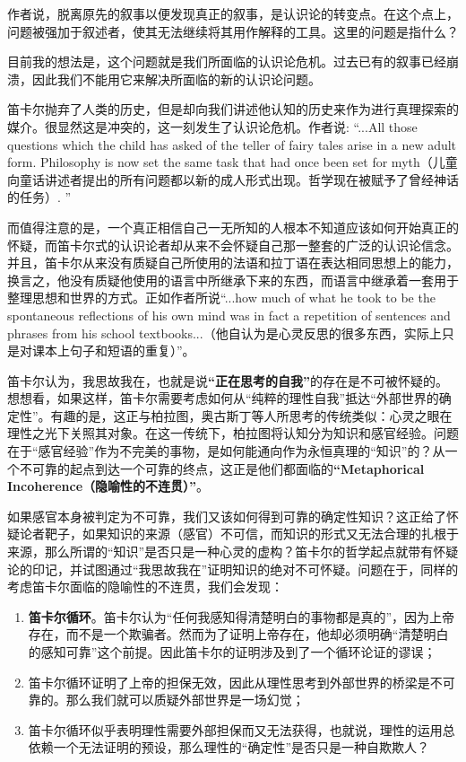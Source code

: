 \documentclass[12pt, a4paper, oneside]{ctexart}
\renewcommand{\b}{\textbf}
\newcommand{\q}[1]{\begin{questionbox}{}#1\end{questionbox}}
\newcommand{\ans}[1]{\begin{ansbox}{}#1\end{ansbox}}
\newcounter{question}[section]
\newcounter{ans}[section]
\begin{document}
\q{作者说，脱离原先的叙事以便发现真正的叙事，是认识论的转变点。在这个点上，问题被强加于叙述者，使其无法继续将其用作解释的工具。这里的问题是指什么？}
\ans{目前我的想法是，这个问题就是我们所面临的认识论危机。过去已有的叙事已经崩溃，因此我们不能用它来解决所面临的新的认识论问题。}

笛卡尔抛弃了人类的历史，但是却向我们讲述他认知的历史来作为进行真理探索的媒介。很显然这是冲突的，这一刻发生了认识论危机。作者说: “...All those questions which the child has asked of the teller of fairy tales arise in a new adult form. Philosophy is now set the same task that had once been set for myth（儿童向童话讲述者提出的所有问题都以新的成人形式出现。哲学现在被赋予了曾经神话的任务）. ”

而值得注意的是，一个真正相信自己一无所知的人根本不知道应该如何开始真正的怀疑，而笛卡尔式的认识论者却从来不会怀疑自己那一整套的广泛的认识论信念。并且，笛卡尔从来没有质疑自己所使用的法语和拉丁语在表达相同思想上的能力，换言之，他没有质疑他使用的语言中所继承下来的东西，而语言中继承着一套用于整理思想和世界的方式。正如作者所说“...how much of what he took to be the spontaneous reflections of his own mind was in fact a repetition of sentences and phrases from his school textbooks...（他自认为是心灵反思的很多东西，实际上只是对课本上句子和短语的重复）”。

笛卡尔认为，我思故我在，也就是说\b{“正在思考的自我”}的存在是不可被怀疑的。想想看，如果这样，笛卡尔需要考虑如何从“纯粹的理性自我”抵达“外部世界的确定性”。有趣的是，这正与柏拉图，奥古斯丁等人所思考的传统类似：心灵之眼在理性之光下关照其对象。在这一传统下，柏拉图将认知分为知识和感官经验。问题在于“感官经验”作为不完美的事物，是如何能通向作为永恒真理的“知识”的？从一个不可靠的起点到达一个可靠的终点，这正是他们都面临的\b{“Metaphorical Incoherence（隐喻性的不连贯）”}。

如果感官本身被判定为不可靠，我们又该如何得到可靠的确定性知识？这正给了怀疑论者靶子，如果知识的来源（感官）不可信，而知识的形式又无法合理的扎根于来源，那么所谓的“知识”是否只是一种心灵的虚构？笛卡尔的哲学起点就带有怀疑论的印记，并试图通过“我思故我在”证明知识的绝对不可怀疑。问题在于，同样的考虑笛卡尔面临的隐喻性的不连贯，我们会发现：
\begin{enumerate}
    \item \b{笛卡尔循环}。笛卡尔认为“任何我感知得清楚明白的事物都是真的”，因为上帝存在，而不是一个欺骗者。然而为了证明上帝存在，他却必须明确“清楚明白的感知可靠”这个前提。因此笛卡尔的证明涉及到了一个循环论证的谬误；
    \item 笛卡尔循环证明了上帝的担保无效，因此从理性思考到外部世界的桥梁是不可靠的。那么我们就可以质疑外部世界是一场幻觉；
    \item 笛卡尔循环似乎表明理性需要外部担保而又无法获得，也就说，理性的运用总依赖一个无法证明的预设，那么理性的“确定性”是否只是一种自欺欺人？
\end{enumerate}
\end{document}
